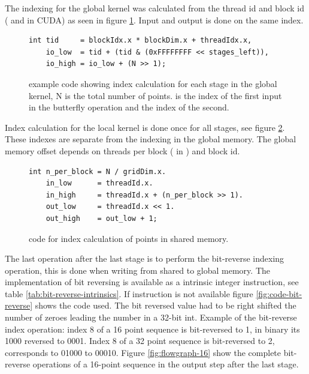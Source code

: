 The indexing for the global kernel was calculated from the thread id and block id ( and  in CUDA) as seen in figure \ref{fig:code-global-index}. Input and output is done on the same index.
\begin{figure}
	\centering
	\lstset{language=C++}
	\begin{framed}
	\begin{lstlisting}
int tid     = blockIdx.x * blockDim.x + threadIdx.x,
    io_low  = tid + (tid & (0xFFFFFFFF << stages_left)),
    io_high = io_low + (N >> 1);
	\end{lstlisting}
	\end{framed}
	\caption{ {\CU} example code showing index calculation for each stage in the global kernel, N is the total number of points.  is the index of the first input in the butterfly operation and  the index of the second.}
	\label{fig:code-global-index}
\end{figure}

Index calculation for the local kernel is done once for all stages, see figure \ref{fig:code-local-index}. These indexes are separate from the indexing in the global memory. The global memory offset depends on threads per block ( in {\CU}) and block id.
\begin{figure}
	\centering
	\lstset{language=C++}
	\begin{framed}
	\begin{lstlisting}
int n_per_block = N / gridDim.x.
    in_low      = threadId.x.
    in_high     = threadId.x + (n_per_block >> 1).
    out_low     = threadId.x << 1.
    out_high    = out_low + 1;
	\end{lstlisting}
	\end{framed}
	\caption{ {\CU} code for index calculation of points in shared memory. }
	\label{fig:code-local-index}
\end{figure}

The last operation after the last stage is to perform the bit-reverse indexing operation, this is done when writing from shared to global memory. The implementation of bit reversing is available as a intrinsic integer instruction, see table \ref{tab:bit-reverse-intrinsics}. If instruction is not available figure \ref{fig:code-bit-reverse} shows the code used. The bit reversed value had to be right shifted the number of zeroes leading the number in a 32-bit int. Example of the bit-reverse index operation: index 8 of a 16 point sequence is bit-reversed to 1, in binary its 1000 reversed to 0001. Index 8 of a 32 point sequence is bit-reversed to 2, corresponds to 01000 to 00010. Figure \ref{fig:flowgraph-16} show the complete bit-reverse operations of a 16-point sequence in the output step after the last stage.

